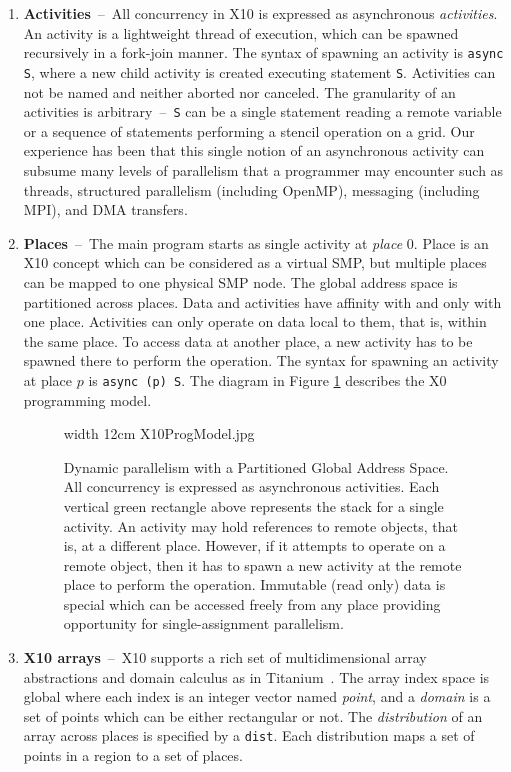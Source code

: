 \begin{enumerate}
\item{\bf Activities}~--~All concurrency in X10 is expressed as asynchronous {\em activities}. An activity is a lightweight thread of execution, which can be spawned recursively in a fork-join manner. The syntax of spawning an activity is {\tt async S}, where a new child activity is created executing statement {\tt S}. Activities can not be named and neither aborted nor canceled. The granularity of an activities is arbitrary~--~{\tt S} can be a single statement reading a remote variable or a sequence of statements performing a stencil operation on a grid.  Our experience has been that this single notion of an asynchronous activity can subsume many levels of parallelism that  a programmer may encounter such as threads, structured parallelism (including OpenMP), messaging (including MPI), and DMA transfers.  
\item{\bf Places}~--~The main program starts as single activity at {\em place} 0. Place is an X10 concept which can be considered as a virtual SMP, but multiple places can be mapped to one physical SMP node. The global address space is partitioned across places. Data and activities have affinity with and only with one place. Activities can only operate on data local to them, that is, within the same place. To access data at another place, a new activity has to be spawned there to perform the operation. The syntax for spawning an activity at place $p$ is {\tt async (p) S}. The diagram in Figure \ref{fig 1} describes the X0 programming model.

\begin{figure}
        \begin{center}
        \pdfimage width 12cm {X10ProgModel.jpg}
        \caption{Dynamic parallelism with a Partitioned Global Address Space. All concurrency is expressed as asynchronous activities.  Each vertical green rectangle above represents the stack for a single activity. An activity may hold references to remote objects, that is, at a different place.  However, if it attempts to operate on a remote object, then it has to spawn a new activity at the remote place to perform the operation.  Immutable (read only) data is special which can be accessed freely from any place providing opportunity for single-assignment parallelism.} \label{fig 1}
        \end{center}
\end{figure}


\item{\bf X10 arrays}~--~X10 supports a rich set of multidimensional array abstractions and domain calculus as in Titanium~\cite{titaniumDoc}. The array index space is global where each index is an integer vector named {\em point}, and a {\em domain} is a set of points which can be either rectangular or not. The {\em distribution} of an array across places is specified by a {\tt dist}. Each distribution maps a set of points in a region to a set of places. 


\end{enumerate}

